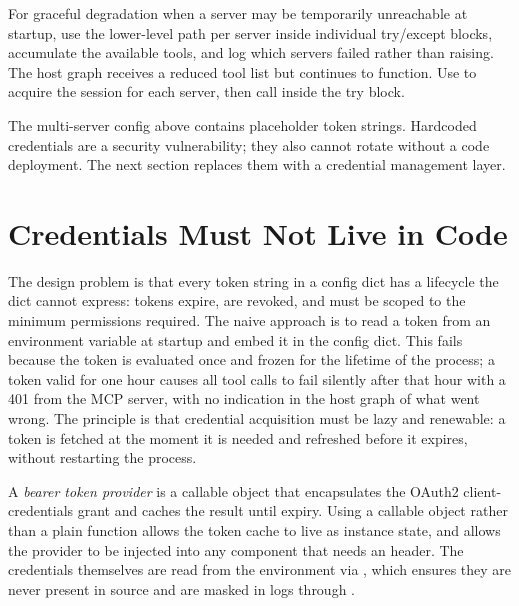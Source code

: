 \begin{tipbox}
For graceful degradation when a server may be temporarily unreachable
at startup, use the lower-level  path per server
inside individual try/except blocks, accumulate the available tools, and
log which servers failed rather than raising. The host graph receives
a reduced tool list but continues to function.
Use  to
acquire the session for each server, then call
 inside the try block.
\end{tipbox}

The multi-server config above contains placeholder token strings.
Hardcoded credentials are a security vulnerability; they also cannot
rotate without a code deployment. The next section replaces them with
a credential management layer.

\section{Credentials Must Not Live in Code}
\label{sec:mcp-oauth}

The design problem is that every token string in a config dict has a
lifecycle the dict cannot express: tokens expire, are revoked, and
must be scoped to the minimum permissions required.
The naive approach is to read a token from an environment variable
at startup and embed it in the config dict. This fails because the
token is evaluated once and frozen for the lifetime of the process;
a token valid for one hour causes all tool calls to fail silently after
that hour with a 401 from the MCP server, with no indication in the
host graph of what went wrong.
The principle is that credential acquisition must be lazy and renewable:
a token is fetched at the moment it is needed and refreshed before it
expires, without restarting the process.

A \emph{bearer token provider} is a callable object that encapsulates
the OAuth2 client-credentials grant and caches the result until
expiry. Using a callable object rather than a plain function allows
the token cache to live as instance state, and allows the provider to
be injected into any component that needs an  header.
The credentials themselves are read from the environment via
, which ensures they are never
present in source and are masked in logs through .

